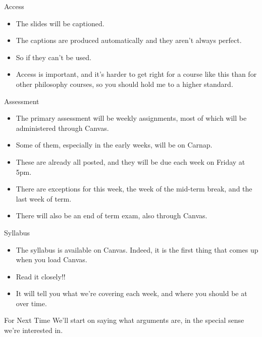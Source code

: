 \documentclass[
  ignorenonframetext,
]{beamer}
\providecommand{\tightlist}{%
  \setlength{\itemsep}{0pt}\setlength{\parskip}{0pt}}
\renewcommand{\,}{\text{, }}
\begin{document}
\begin{frame}{Access}
\protect\hypertarget{access}{}
\begin{itemize}
\tightlist
\item
  The slides will be captioned.
\item
  The captions are produced automatically and they aren't always
  perfect.
\item
  So if they can't be used.
\item
  Access is important, and it's harder to get right for a course like
  this than for other philosophy courses, so you should hold me to a
  higher standard.
\end{itemize}
\end{frame}

\begin{frame}{Assessment}
\protect\hypertarget{assessment}{}
\begin{itemize}
\tightlist
\item
  The primary assessment will be weekly assignments, most of which will
  be administered through Canvas.
\item
  Some of them, especially in the early weeks, will be on Carnap.
\item
  These are already all posted, and they will be due each week on Friday
  at 5pm.
\item
  There are exceptions for this week, the week of the mid-term break,
  and the last week of term.
\item
  There will also be an end of term exam, also through Canvas.
\end{itemize}
\end{frame}

\begin{frame}{Syllabus}
\protect\hypertarget{syllabus}{}
\begin{itemize}
\tightlist
\item
  The syllabus is available on Canvas. Indeed, it is the first thing
  that comes up when you load Canvas.
\item
  Read it closely!!
\item
  It will tell you what we're covering each week, and where you should
  be at over time.
\end{itemize}
\end{frame}

\begin{frame}{For Next Time}
\protect\hypertarget{for-next-time}{}
We'll start on saying what arguments are, in the special sense we're
interested in.
\end{frame}
\end{document}
